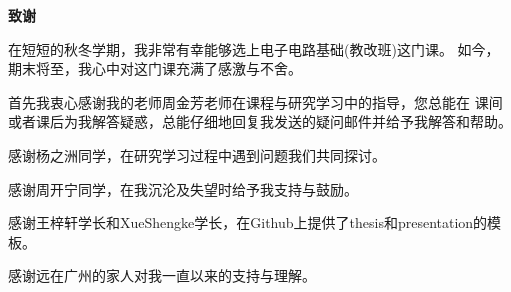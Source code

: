 \newpage
\begin{center}
    \bfseries {} 致谢
\end{center}
\par 在短短的秋冬学期，我非常有幸能够选上电子电路基础(教改班)这门课。
如今，期末将至，我心中对这门课充满了感激与不舍。
\par 首先我衷心感谢我的老师周金芳老师在课程与研究学习中的指导，您总能在
课间或者课后为我解答疑惑，总能仔细地回复我发送的疑问邮件并给予我解答和帮助。
\par 感谢杨之洲同学，在研究学习过程中遇到问题我们共同探讨。
\par 感谢周开宁同学，在我沉沦及失望时给予我支持与鼓励。
\par 感谢王梓轩学长和XueShengke学长，在Github上提供了thesis和presentation的\text{\LaTeX}模板。
\par 感谢远在广州的家人对我一直以来的支持与理解。